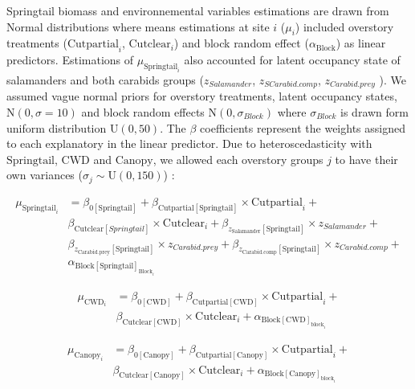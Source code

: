 Springtail biomass and environnemental variables estimations are drawn from Normal distributions where means estimations at site $i$ ($\mu_{i}$) included overstory treatments ($\text{Cutpartial}_i$, $\text{Cutclear}_i$) and block random effect ($\alpha_{\text{Block}}$) as linear predictors. 
Estimations of $\mu_{\text{Springtail}_i}$ also accounted for latent occupancy state of salamanders and both carabids groups ($z_{Salamander}$, $z_{SCarabid.comp}$, $z_{Carabid.prey}$ ). 
We assumed vague normal priors for overstory treatments, latent occupancy states, $\text{N}(0, \sigma = 10)$ and block random effects $\text{N}(0, \sigma_{Block})$ 
where $\sigma_{Block}$ is drawn form uniform distribution $\text{U}(0, 50)$. 
The $\beta$ coefficients represent the weights assigned to each explanatory in the linear predictor.
Due to heteroscedasticity with $\text{Springtail}$, $\text{CWD}$ and $\text{Canopy}$, we allowed each overstory groups $j$ to have their own variances ($\sigma_j \sim \text{U}(0,150)$) :

\begin{align}
  \mu_{\text{Springtail}_i} &= \beta_{0[\text{Springtail}]} + \beta_{\text{Cutpartial}[\text{Springtail}]} \times \text{Cutpartial}_i + \nonumber\\
  &\beta_{\text{Cutclear}[Springtail]} \times \text{Cutclear}_i + \beta_{z_{\text{Salamander}}[\text{Springtail}]} \times z_{Salamander} +  \nonumber\\
  &\beta_{z_{\text{Carabid.prey}}[\text{Springtail}]} \times z_{Carabid.prey} + \beta_{z_{\text{Carabid.comp}}[\text{Springtail}]} \times z_{Carabid.comp} + \nonumber\\
  &\alpha_{\text{Block}[\text{Springtail}]_{\text{Block}_i}} \nonumber
\end{align}

\begin{align}
  \mu_{\text{CWD}_i} &= \beta_{0[\text{CWD}]} + \beta_{\text{Cutpartial}[\text{CWD}]} \times \text{Cutpartial}_{i} + \nonumber\\
  & \beta_{\text{Cutclear}[\text{CWD}]} \times \text{Cutclear}_{i} + \alpha_{\text{Block}[\text{CWD}]_{\text{block}_i}} 
\end{align}


\begin{align}
  \mu_{\text{Canopy}_i} &= \beta_{0[\text{Canopy}]} + \beta_{\text{Cutpartial}[\text{Canopy}]} \times \text{Cutpartial}_{i} + \nonumber \\
  & \beta_{\text{Cutclear}[\text{Canopy}]} \times \text{Cutclear}_{i} + \alpha_{\text{Block}[\text{Canopy}]_{\text{block}_i}} \nonumber
\end{align}


